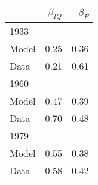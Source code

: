 \begin{tabular}{lrr}
\hline
  & $\beta_{IQ}$  & $\beta_{F}$  \\ 
\hline
1933 &   &   \\ 
Model & 0.25  & 0.36  \\ 
Data & 0.21  & 0.61  \\ 
1960 &   &   \\ 
Model & 0.47  & 0.39  \\ 
Data & 0.70  & 0.48  \\ 
1979 &   &   \\ 
Model & 0.55  & 0.38  \\ 
Data & 0.58  & 0.42  \\ 
\hline
\end{tabular}%
